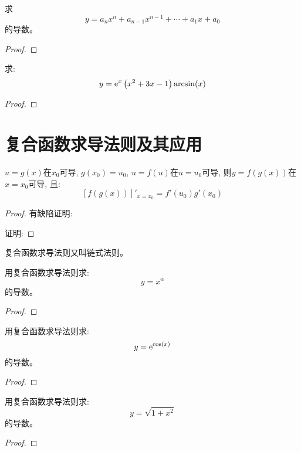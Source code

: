 \begin{proposition}
    求
    \[ y = a_nx^n+a_{n-1}x^{n-1}+\cdots+a_1x+a_0 \]
    的导数。
\end{proposition}
\begin{proof}
    
\end{proof}

\begin{proposition}
    求:
    \[ y = \mathrm{e}^x\left(x^2+3x-1\right)\arcsin(x)\]
\end{proposition}
\begin{proof}
    
\end{proof}

\section{复合函数求导法则及其应用}
\begin{proposition}
    $u = g(x)$在$x_0$可导, $g(x_0) = u_0$, $u = f(u)$在$u = u_0$可导, 则$y = f\left(g(x)\right)$在$x = x_0$可导, 且:
    \[ \left[ f\left(g(x)\right)\right]'_{x=x_0} = f'(u_0)g'(x_0) \]
\end{proposition}
\begin{proof}
    有缺陷证明:

    证明:

\end{proof}
复合函数求导法则又叫链式法则。

\begin{example}
    用复合函数求导法则求:
    \[ y = x^\alpha \]
    的导数。
\end{example}
\begin{proof}
    
\end{proof}

\begin{example}
    用复合函数求导法则求:
    \[ y = \mathrm{e}^{\cos(x)} \]
    的导数。
\end{example}
\begin{proof}
    
\end{proof}

\begin{example}
    用复合函数求导法则求:
    \[ y = \sqrt{1+x^2} \]
    的导数。
\end{example}
\begin{proof}
    
\end{proof}

